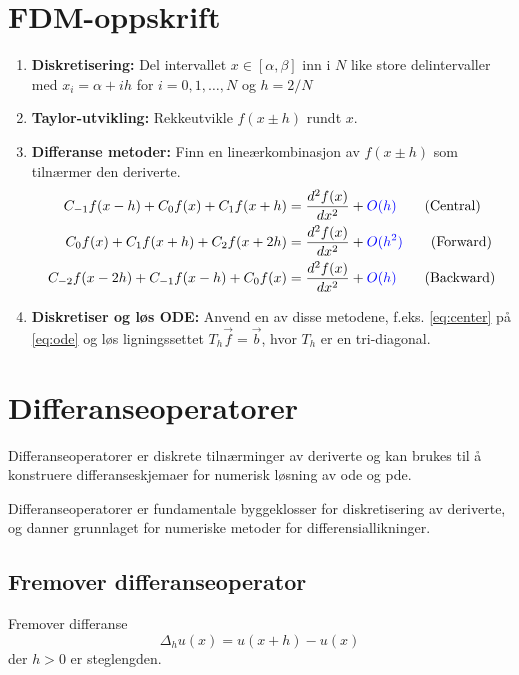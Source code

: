 \section{FDM-oppskrift}
\begin{enumerate}
	\item \textbf{Diskretisering:} Del intervallet \(x \in [\alpha, \beta]\) inn i \(N\) like store delintervaller med \(x_i = \alpha + ih\) for \(i = 0,1,\ldots,N\) og \(h = 2/N\)
	\item \textbf{Taylor-utvikling:} Rekkeutvikle \(f(x \pm h)\) rundt \(x\).
	\item \textbf{Differanse metoder:} Finn en lineærkombinasjon av \(f(x \pm h)\) som tilnærmer den deriverte.
	      \begin{align}
		      C_{-1}f(x - h) + C_0f(x) + C_1f(x + h)   & = \ddn[f(x)]{2}{x} + \mathcolor{blue}{O(h)} \tag{Central} \label{eq:center}    \\
		      C_{0}f(x) + C_1f(x + h ) + C_2f(x + 2h)  & = \ddn[f(x)]{2}{x} + \mathcolor{blue}{O(h^2)} \tag{Forward} \label{eq:forward} \\
		      C_{-2}f(x - 2h) + C_{-1}f(x-h) + C_0f(x) & = \ddn[f(x)]{2}{x} + \mathcolor{blue}{O(h)} \tag{Backward} \label{eq:backward}
	      \end{align}
	\item \textbf{Diskretiser og løs ODE:} Anvend en av disse metodene, f.eks. \ref{eq:center} på \ref{eq:ode} og løs ligningssettet \(T_h \vec{f} = \vec{b}\), hvor \(T_h\) er en tri-diagonal.
\end{enumerate}

\section{Differanseoperatorer}

Differanseoperatorer er diskrete tilnærminger av deriverte og kan brukes til å konstruere differanseskjemaer for numerisk løsning av \gls{ode} og \gls{pde}.

Differanseoperatorer er fundamentale byggeklosser for diskretisering av deriverte, og danner grunnlaget for numeriske metoder for differensiallikninger.

\subsection{Fremover differanseoperator}
\begin{definition}{Fremover differanse}{}
	\begin{equation}
		\Delta_h u(x) = u(x + h) - u(x) \label{eq:forward_diff}
	\end{equation}
	der $h > 0$ er steglengden.
\end{definition}

